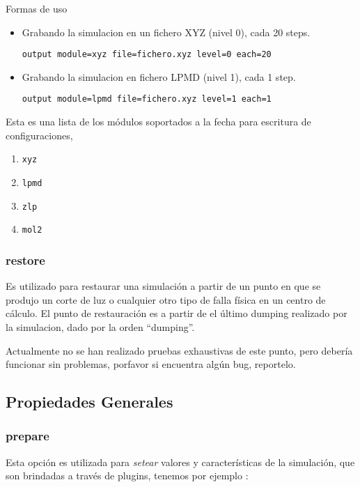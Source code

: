 \documentclass[a4paper,10pt]{scrbook}
\newcommand{\control}[1]{\begin{center}\begin{minipage}{10cm}\texttt{#1}\end{minipage}\end{center}}
\begin{document}
Formas de uso

\begin{itemize}
 \item Grabando la simulacion en un fichero XYZ (nivel 0), cada 20 steps.
\control{output module=xyz file=fichero.xyz level=0 each=20}
 \item Grabando la simulacion en fichero LPMD (nivel 1), cada 1 step.
\control{output module=lpmd file=fichero.xyz level=1 each=1}
\end{itemize}

Esta es una lista de los m\'odulos soportados a la fecha para escritura de configuraciones,

\begin{enumerate}
 \item \verb|xyz|
 \item \verb|lpmd|
 \item \verb|zlp|
 \item \verb|mol2|
\end{enumerate}


\subsubsection{restore}

Es utilizado para restaurar una simulaci\'on a partir de un punto en que se produjo un corte de luz o cualquier otro tipo de falla f\'isica en un centro de c\'alculo. El punto de restauraci\'on es a partir de el \'ultimo dumping realizado por la simulacion, dado por la orden ``dumping''.

Actualmente no se han realizado pruebas exhaustivas de este punto, pero deber\'ia funcionar sin problemas, porfavor si encuentra alg\'un bug, reportelo.

\subsection{Propiedades Generales}
\subsubsection{prepare}
Esta opci\'on es utilizada para \textit{setear} valores y caracter\'isticas de la simulaci\'on, que son brindadas a trav\'es de plugins, tenemos por ejemplo :
\end{document}
